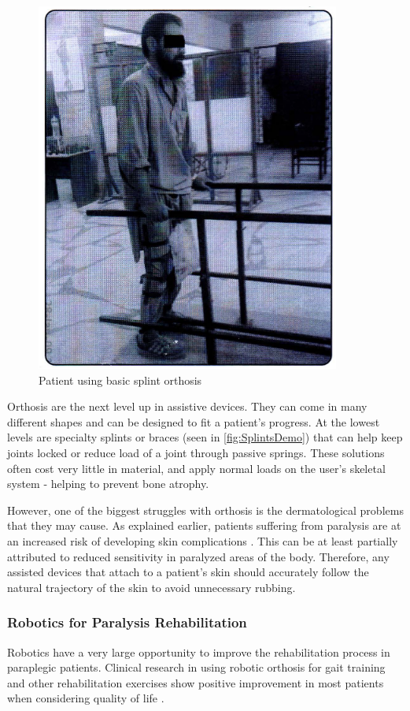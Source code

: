 \begin{figure} [h!]
    \centering
    \includegraphics[width=0.5\linewidth]{Figures/Background/SplintsDemo.png}
    \caption{Patient using basic splint orthosis \cite{RehabParaplegia}}
    \label{fig:SplintsDemo}
\end{figure}

Orthosis are the next level up in assistive devices. They can come in many different shapes and can be designed to fit a patient's progress. At the lowest levels are specialty splints or braces (seen in \autoref{fig:SplintsDemo}) that can help keep joints locked or reduce load of a joint through passive springs. These solutions often cost very little in material, and apply normal loads on the user's skeletal system - helping to prevent bone atrophy. 

However, one of the biggest struggles with orthosis is the dermatological problems that they may cause. As explained earlier, patients suffering from paralysis are at an increased risk of developing skin complications \cite{DermatologicalIssuesParalysis}. This can be at least partially attributed to reduced sensitivity in paralyzed areas of the body. Therefore, any assisted devices that attach to a patient's skin should accurately follow the natural trajectory of the skin to avoid unnecessary rubbing.

\subsubsection{Robotics for Paralysis Rehabilitation}
Robotics have a very large opportunity to improve the rehabilitation process in paraplegic patients. Clinical research in using robotic orthosis for gait training and other rehabilitation exercises show positive improvement in most patients when considering quality of life \cite{GaitTrainingBenefitsRoboticsWalkbot} \cite{RoboticGaitTraining}. 

